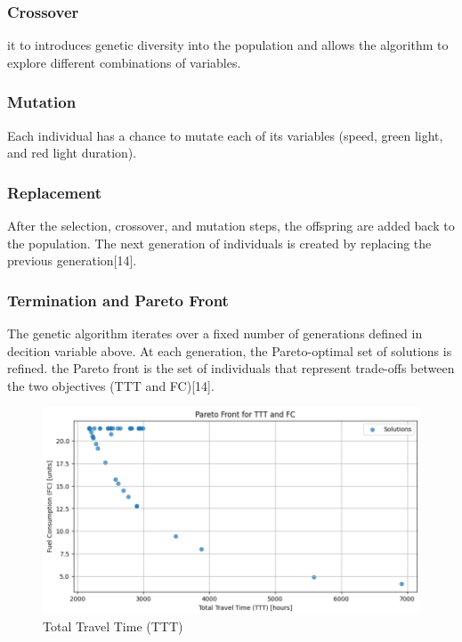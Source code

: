  \subsubsection{Crossover}
 it to introduces genetic diversity into the population and allows the algorithm to explore different combinations of variables.
 \subsubsection{Mutation}
 Each individual has a chance to mutate each of its variables (speed, green light, and red light duration).
 \subsubsection{Replacement}
 After the selection, crossover, and mutation steps, the offspring are added back to the population. The next generation of individuals is created by replacing the previous generation[14].
 \subsubsection{Termination and Pareto Front}
 The genetic algorithm iterates over a fixed number of generations defined in decition variable above. At each generation, the Pareto-optimal set of solutions is refined. the Pareto front is the set of individuals that represent trade-offs between the two objectives (TTT and FC)[14].
\begin{figure}[H]  %
    \centering
    \includegraphics[width=\textwidth]{figures/TTT.PNG}
    \caption{Total Travel Time (TTT)}
    \label{fig:Total_Travel_Time}
\end{figure}

